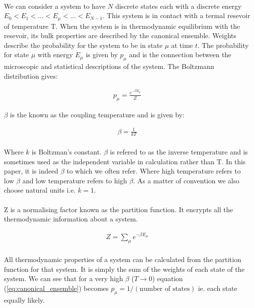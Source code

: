 \documentclass[12pt] {report} %
\begin{document}
			\paragraph{}
				We can consider a system to have $N$ discrete states each with a discrete energy $E_0 < E_1 < ... < E_\mu < ... < E_{N-1}$. This system is in contact with a termal resevoir of temperature T. When the system is in thermodynamic equilibrium with the resevoir, its bulk properties are described by the canonical ensemble. Weights describe the probability for the system to be in state $\mu$ at time $t$. The probability for state $\mu$ with energy $E_{\mu}$ is given by $p_\mu$ and is the connection between the microscopic and statistical descriptions of the system. The Boltzmann distribution gives: 
				
			\begin{align}
				p_{\mu} = \frac{e^{-\beta E_\mu}}{Z}  \label{eq:canonical_ensemble}
			\end{align}
			
				$\beta$ is the known as the coupling temperature and is given by:
			
			\begin{align}
				\beta = \frac{1}{kT}			\label{eq:beta}
			\end{align}
			
			\paragraph{}
				Where $k$ is Boltzman's constant. $\beta$ is refered to as the inverse temperature and is sometimes used as the independent variable in calculation rather than T. In this paper, it is indeed $\beta$ to which we often refer. Where high temperature refers to low $\beta$ and low temperature refers to high $\beta$. As a matter of convention we also choose natural units i.e. $k=1$.
		
			\paragraph{}
				Z is a normalising factor known as the partition function. It encrypts all the thermodynamic information about a system.
				
			\begin{align}
				Z = \sum_{\mu}^{}e^{-\beta E_{\mu}} 	\label{eq:partition_function}
			\end{align}
			
			\paragraph{}
				All thermodynamic properties of a system can be calculated from the partition function for that system. It is simply the sum of the weights of each state of the system. We can see that for a very high $\beta$ ($T \rightarrow 0$) equation (\ref{eq:canonical_ensemble}) becomes $p_\mu = 1/(\text{number of states})$ ie. each state equally likely. 
			
\end{document}
